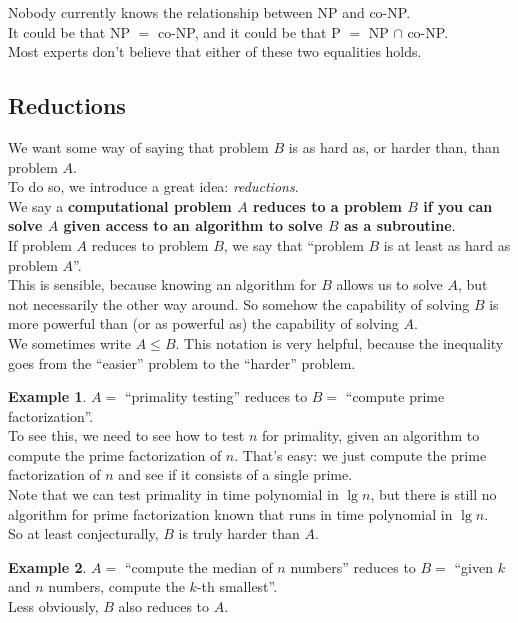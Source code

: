 \documentclass[12pt]{article}
\theoremstyle{plain}
\theoremstyle{definition}
\newtheorem*{ex*}{Example}
\begin{document}
Nobody currently knows the relationship between NP and co-NP. \\
It could be that NP $=$ co-NP, and it could be that P $=$ NP $\cap$ co-NP. \\
Most experts don't believe that either of these two equalities holds.

\subsection{Reductions}
We want some way of saying that problem $B$ is as hard as, or harder than, than problem $A$. \\
To do so, we introduce a great idea: \emph{reductions}. \\

We say a \textbf{computational problem $A$ reduces to a problem $B$ if you can solve $A$ given access to an algorithm to solve $B$ as a subroutine}. \\

If problem $A$ reduces to problem $B$, we say that ``problem $B$ is at least as hard as problem $A$''. \\
This is sensible, because knowing an algorithm for $B$ allows us to solve $A$, but not necessarily the other way around.
So somehow the capability of solving $B$ is more powerful than (or as powerful as) the capability of solving $A$. \\
We sometimes write $A \leq B$.
This notation is very helpful, because the inequality goes from the ``easier'' problem to the ``harder'' problem. \\

\begin{ex*}
$A =$ ``primality testing'' reduces to $B =$ ``compute prime factorization''. \\
To see this, we need to see how to test $n$ for primality, given an algorithm to compute the prime factorization of $n$.
That's easy: we just compute the prime factorization of $n$ and see if it consists of a single prime. \\
Note that we can test primality in time polynomial in $\lg{n}$, but there is still no algorithm for prime factorization known that runs in time polynomial in $\lg{n}$. \\
So at least conjecturally, $B$ is truly harder than $A$.
\end{ex*}

\begin{ex*}
$A =$ ``compute the median of $n$ numbers'' reduces to $B =$ ``given $k$ and $n$ numbers, compute the $k$-th smallest''. \\
Less obviously, $B$ also reduces to $A$.
\end{ex*}
\end{document}
